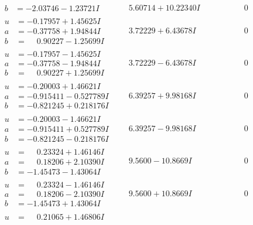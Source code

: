 \documentclass[1p]{elsarticle_modified}
\theoremstyle{definition}
\begin{document}
$$\begin{array}{c|c|c}
\begin{aligned}
b &= -2.03746 - 1.23721 I\end{aligned}
 & \phantom{-}5.60714 + 10.22340 I & \phantom{-0.000000 } 0 \\ \hline\begin{aligned}
u &= -0.17957 + 1.45625 I \\
a &= -0.37758 + 1.94844 I \\
b &= \phantom{-}0.90227 - 1.25699 I\end{aligned}
 & \phantom{-}3.72229 + 6.43678 I & \phantom{-0.000000 } 0 \\ \hline\begin{aligned}
u &= -0.17957 - 1.45625 I \\
a &= -0.37758 - 1.94844 I \\
b &= \phantom{-}0.90227 + 1.25699 I\end{aligned}
 & \phantom{-}3.72229 - 6.43678 I & \phantom{-0.000000 } 0 \\ \hline\begin{aligned}
u &= -0.20003 + 1.46621 I \\
a &= -0.915411 - 0.527789 I \\
b &= -0.821245 + 0.218176 I\end{aligned}
 & \phantom{-}6.39257 + 9.98168 I & \phantom{-0.000000 } 0 \\ \hline\begin{aligned}
u &= -0.20003 - 1.46621 I \\
a &= -0.915411 + 0.527789 I \\
b &= -0.821245 - 0.218176 I\end{aligned}
 & \phantom{-}6.39257 - 9.98168 I & \phantom{-0.000000 } 0 \\ \hline\begin{aligned}
u &= \phantom{-}0.23324 + 1.46146 I \\
a &= \phantom{-}0.18206 + 2.10390 I \\
b &= -1.45473 - 1.43064 I\end{aligned}
 & \phantom{-}9.5600 - 10.8669 I & \phantom{-0.000000 } 0 \\ \hline\begin{aligned}
u &= \phantom{-}0.23324 - 1.46146 I \\
a &= \phantom{-}0.18206 - 2.10390 I \\
b &= -1.45473 + 1.43064 I\end{aligned}
 & \phantom{-}9.5600 + 10.8669 I & \phantom{-0.000000 } 0 \\ \hline\begin{aligned}
u &= \phantom{-}0.21065 + 1.46806 I \\

\end{aligned}
\end{array}$$
\end{document}
